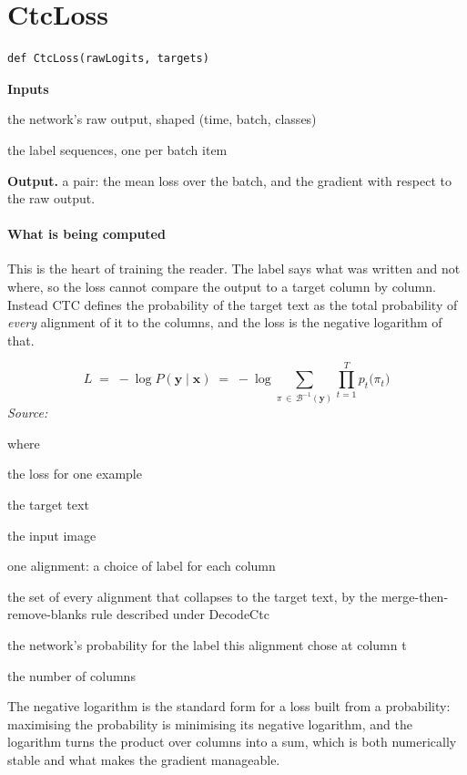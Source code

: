 \section{CtcLoss}
\begin{lstlisting}[style=sig]
def CtcLoss(rawLogits, targets)
\end{lstlisting}

\noindent\textbf{Inputs}
\begin{description}[leftmargin=2.2em,style=nextline,font=\normalfont\ttfamily]\setlength\itemsep{1pt}
  \item[{rawLogits}] \normalfont the network's raw output, shaped (time, batch, classes)
  \item[{targets}] \normalfont the label sequences, one per batch item
\end{description}

\noindent\textbf{Output.} a pair: the mean loss over the batch, and the gradient with respect to the raw output.


\paragraph{What is being computed}
This is the heart of training the reader. The label says what was written and not where, so the loss cannot compare the output to a target column by column. Instead CTC \cite{graves2006} defines the probability of the target text as the total probability of \emph{every} alignment of it to the columns, and the loss is the negative logarithm of that.


\begin{equation}
L \;=\; -\log P(\mathbf{y} \mid \mathbf{x}) \;=\; -\log \!\!\sum_{\pi \,\in\, \mathcal{B}^{-1}(\mathbf{y})} \prod_{t=1}^{T} p_t\big(\pi_t\big)
\end{equation}
\noindent\emph{Source: }\cite{graves2006}


\noindent where
\begin{description}[leftmargin=2.4em,style=nextline,font=\normalfont\ttfamily]\setlength\itemsep{1pt}
  \item[{$L$}] \normalfont the loss for one example
  \item[{$\mathbf{y}$}] \normalfont the target text
  \item[{$\mathbf{x}$}] \normalfont the input image
  \item[{$\pi$}] \normalfont one alignment: a choice of label for each column
  \item[{$\mathcal{B}^{-1}(\mathbf{y})$}] \normalfont the set of every alignment that collapses to the target text, by the merge-then-remove-blanks rule described under DecodeCtc
  \item[{$p_t(\pi_t)$}] \normalfont the network's probability for the label this alignment chose at column t
  \item[{$T$}] \normalfont the number of columns
\end{description}
The negative logarithm is the standard form for a loss built from a probability: maximising the probability is minimising its negative logarithm, and the logarithm turns the product over columns into a sum, which is both numerically stable and what makes the gradient manageable.



